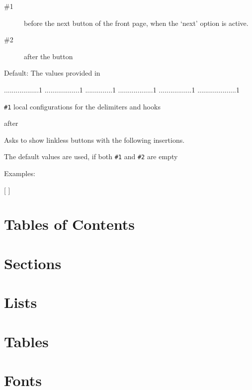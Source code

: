\documentclass{book}
\begin{document}
\begin{description}
  \item[\#1]  before the next button of the front page, when the `next'
       option is active.
  \item[\#2]  after the button
\end{description}

    Default: The values provided in 

\begin{texsource}
..................1
..................1
..............1
..................1
.................1
....................1
\end{texsource}

  \verb|#1| local configurations for the delimiters and hooks

 {after}\EndDoc

Asks to show linkless buttons with the following insertions.

The default values are used, if both \verb|#1| and \verb|#2| are empty

   Examples:

\begin{texsource}

    {[}
    {] }
\end{texsource}

\section{Tables of Contents}

\section{Sections}
\section{Lists}
\section{Tables}

\section{Fonts}
\end{document}
